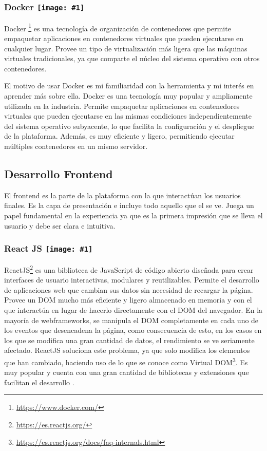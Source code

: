 \renewcommand{\icon}[1]{\texttt{[image: \#1]}}
\subsubsection*{Docker \protect\icon{./imagenes/docker_logo.png}}

Docker \footnote{\url{https://www.docker.com/}} es una tecnología de organización de contenedores que permite empaquetar aplicaciones en contenedores virtuales que pueden ejecutarse en cualquier lugar. Provee un tipo de virtualización más ligera que las máquinas virtuales tradicionales, ya que comparte el núcleo del sistema operativo con otros contenedores.\newline

El motivo de usar Docker es mi familiaridad con la herramienta y mi interés en aprender más sobre ella. Docker es una tecnología muy popular y ampliamente utilizada en la industria. Permite empaquetar aplicaciones en contenedores virtuales que pueden ejecutarse en las mismas condiciones independientemente del sistema operativo subyacente, lo que facilita la configuración y el despliegue de la plataforma. Además, es muy eficiente y ligero, permitiendo ejecutar múltiples contenedores en un mismo servidor.

\subsection{Desarrollo Frontend}

El frontend es la parte de la plataforma con la que interactúan los usuarios finales. Es la capa de presentación e incluye todo aquello que el se ve. Juega un papel fundamental en la experiencia ya que es la primera impresión que se lleva el usuario y debe ser clara e intuitiva.\newline

\renewcommand{\icon}[1]{\texttt{[image: \#1]}}
\subsubsection*{React JS \protect\icon{./imagenes/react_logo.png}}

ReactJS\footnote{\url{https://es.reactjs.org/}} es una biblioteca de JavaScript de código abierto diseñada para crear interfaces de usuario interactivas, modulares y reutilizables. Permite el desarrollo de aplicaciones web que cambian sus datos sin necesidad de recargar la página. Provee un DOM mucho más eficiente y ligero almacenado en memoria y con el que interactúa en lugar de hacerlo directamente con el DOM del navegador. En la mayoría de webframeworks, se manipula el DOM completamente en cada uno de los eventos que desencadena la página, como consecuencia de esto, en los casos en los que se modifica una gran cantidad de datos, el rendimiento se ve seriamente afectado. ReactJS soluciona este problema, ya que solo modifica los elementos que han cambiado, haciendo uso de lo que se conoce como Virtual DOM\footnote{\url{https://es.reactjs.org/docs/faq-internals.html}}. Es muy popular y cuenta con una gran cantidad de bibliotecas y extensiones que facilitan el desarrollo \cite{aggarwal2018modern}.\newline

